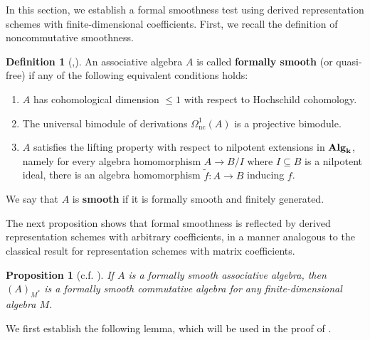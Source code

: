 \documentclass{article}
\numberwithin{equation}{section} %
\theoremstyle{plain}
\newtheorem{proposition}[theorem]{Proposition}
\theoremstyle{definition}
\newtheorem{definition}[theorem]{Definition}
\theoremstyle{remark}
\begin{document}
In this section, we establish a formal smoothness test using derived representation schemes with finite-dimensional coefficients.
First, we recall the definition of noncommutative smoothness.

\begin{definition}[{\cite[Proposition 3.3]{CQ95},\cite{KR00}}]\label{Def_Smoothness}
An associative algebra $A$ is called \textbf{formally smooth} (or quasi-free) if any of the following equivalent conditions holds:
\begin{enumerate}
\item $A$ has cohomological dimension $\leq1$ with respect to Hochschild cohomology.
\item The universal bimodule of derivations $\Omega^1_{\mathrm{nc}}(A)$ is a projective bimodule.
\item $A$ satisfies the lifting property with respect to nilpotent extensions in $\bf{Alg}_k$, namely for every algebra homomorphism $A\to B/I$ where $I\subseteq B$ is a nilpotent ideal, there is an algebra homomorphism $\tilde{f}:A\to B$ inducing $f$.
\end{enumerate}
We say that $A$ is \textbf{smooth} if it is formally smooth and finitely generated.
\end{definition}

The next proposition shows that formal smoothness is reflected by derived representation schemes with arbitrary coefficients, in a manner analogous to the classical result for representation schemes with matrix coefficients.

\begin{proposition}[c.f. {\cite[Proposition 19.1.4]{G05}}]\label{Proposition_SmoothnessOfGeneralRepSchemes}
If $A$ is a formally smooth associative algebra, then $(A)_{M^*}$ is a formally smooth commutative algebra for any finite-dimensional algebra $M$.
\end{proposition}

We first establish the following lemma, which will be used in the proof of .
\end{document}
